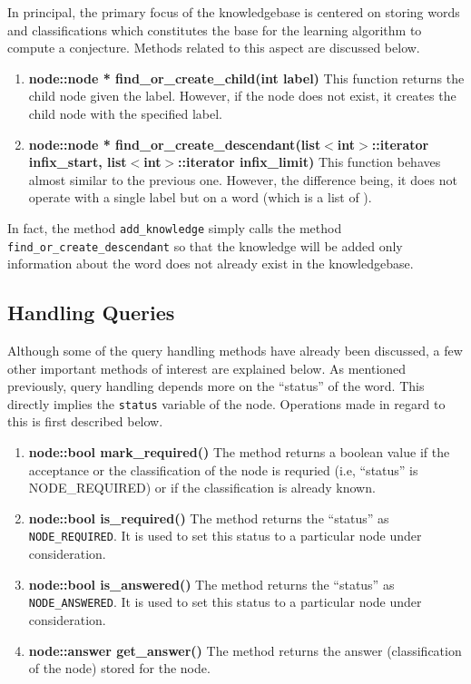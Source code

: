 In principal, the primary focus of the knowledgebase is centered on storing words and classifications which constitutes the base for the learning algorithm to compute a conjecture. Methods related to this aspect are discussed below.
	
\begin{enumerate}
\item \textbf{node::node * find\_or\_create\_child(int label)} \vskip 1pt
	This function returns the child node given the label. However, if the node does not exist, it creates the child node with the specified label.
	
\item \textbf{node::node * find\_or\_create\_descendant(list$<$int$>$::iterator infix\_start, list$<$int$>$::iterator infix\_limit)} \hfill \vskip 1pt
	This function behaves almost similar to the previous one. However, the difference being, it does not operate with a single label but on a word (which is a list of \integer). 
\end{enumerate}	

 In fact, the method \texttt{add\_knowledge} simply calls the method \texttt{find\_or\_create\_descendant} so that the knowledge will be added only information about the word does not already exist in the knowledgebase.


\subsection*{Handling Queries}
Although some of the query handling methods have already been discussed, a few other important methods of interest are explained below. As mentioned previously, query handling depends more on the ``status'' of the word. This directly implies the \texttt{status} variable of the node. Operations made in regard to this is first described below.
\begin{enumerate}
\item \textbf{node::bool mark\_required()} \vskip 1pt
The method returns a boolean value \true if the acceptance or the classification of the node is requried (i.e, ``status'' is NODE\_REQUIRED) or \false if the classification is already known.
	
\item \textbf{node::bool is\_required()} \vskip 1pt
The method returns the ``status'' as \texttt{NODE\_REQUIRED}. It is used to set this status to a particular node under consideration.

\item \textbf{node::bool is\_answered()} \vskip 1pt
The method returns the ``status'' as \texttt{NODE\_ANSWERED}. It is used to set this status to a particular node under consideration.
	
\item \textbf{node::answer get\_answer()} \vskip 1pt
The method returns the answer (classification of the node) stored for the node. 
\end{enumerate}

